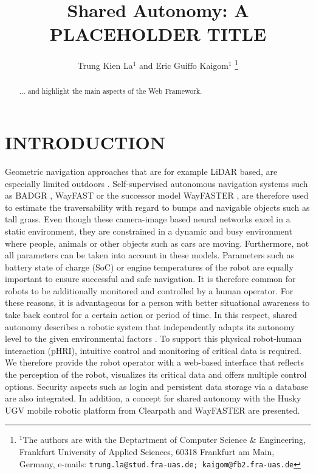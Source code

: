 \documentclass[letterpaper, 10 pt, conference]{ieeeconf}  %
\title{\LARGE \bf
Shared Autonomy: A PLACEHOLDER TITLE
}
\author{Trung Kien La$^{1}$ and Eric Guiffo Kaigom$^{1}$%
\thanks{$^{1}$The authors are with the Deptartment of Computer Science \& Engineering,
        Frankfurt University of Applied Sciences, 60318 Frankfurt am Main, Germany, e-mails:
        {\tt\small trung.la@stud.fra-uas.de; kaigom@fb2.fra-uas.de}}%
}
\begin{document}
\maketitle
\thispagestyle{empty}
\pagestyle{empty}


\begin{abstract}

... and highlight the main aspects of the Web Framework.

\end{abstract}


\section{INTRODUCTION}
Geometric navigation approaches that are for example LiDAR based, are especially limited outdoors \cite{wayfast}.
Self-supervised autonomous navigation systems such as BADGR \cite{BADGR}, WayFAST \cite{wayfast} or the successor model WayFASTER \cite{wayfaster}, are therefore used to estimate the traversability with regard to bumps and navigable objects such as tall grass.
Even though these camera-image based neural networks excel in a static environment, they are constrained in a dynamic and busy environment where people, animals or other objects such as cars are moving.
Furthermore, not all parameters can be taken into account in these models. Parameters such as battery state of charge (SoC) or engine temperatures of the robot are equally important to ensure successful and safe navigation.
It is therefore common for robots to be additionally monitored and controlled by a human operator.
For these reasons, it is advantageous for a person with better situational awareness to take back control for a certain action or period of time. 
In this respect, shared autonomy describes a robotic system that independently adapts its autonomy level to the given environmental factors \cite{phri}. 
To support this physical robot-human interaction (pHRI), intuitive control and monitoring of critical data is required. 
We therefore provide the robot operator with a web-based interface that reflects the perception of the robot, visualizes its critical data and offers multiple control options. 
Security aspects such as login and persistent data storage via a database are also integrated. 
In addition, a concept for shared autonomy with the Husky UGV mobile robotic platform from Clearpath \cite{husky} and WayFASTER are presented. 
\end{document}
